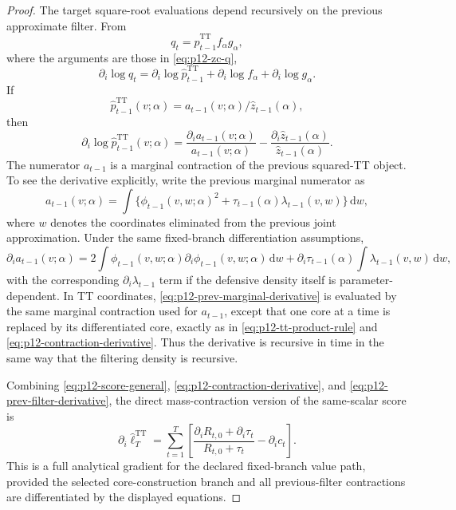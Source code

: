 \documentclass[11pt]{article}
\newcommand{\dd}{\mathrm{d}}
\newcommand{\TT}{\mathrm{TT}}
\theoremstyle{definition}
\theoremstyle{remark}
\begin{document}
\begin{proof}
The target square-root evaluations depend recursively on the previous
approximate filter.  From
\[
  q_t
  =
  \widehat p_{t-1}^{\TT}
  f_\alpha
  g_\alpha,
\]
where the arguments are those in \eqref{eq:p12-zc-q},
\[
  \partial_i\log q_t
  =
  \partial_i\log\widehat p_{t-1}^{\TT}
  +
  \partial_i\log f_\alpha
  +
  \partial_i\log g_\alpha.
  \label{eq:p12-recursive-logq-derivative}
\]
If
\[
  \widehat p_{t-1}^{\TT}(v;\alpha)
  =
  a_{t-1}(v;\alpha)/\widehat z_{t-1}(\alpha),
\]
then
\[
  \partial_i\log\widehat p_{t-1}^{\TT}(v;\alpha)
  =
  \frac{\partial_i a_{t-1}(v;\alpha)}{a_{t-1}(v;\alpha)}
  -
  \frac{\partial_i\widehat z_{t-1}(\alpha)}
       {\widehat z_{t-1}(\alpha)}.
  \label{eq:p12-prev-filter-derivative}
\]
The numerator \(a_{t-1}\) is a marginal contraction of the previous squared-TT
object.  To see the derivative explicitly, write the previous marginal
numerator as
\[
  a_{t-1}(v;\alpha)
  =
  \int
  \{\phi_{t-1}(v,w;\alpha)^2
  +\tau_{t-1}(\alpha)\lambda_{t-1}(v,w)\}
  \,\dd w,
  \label{eq:p12-prev-marginal-numerator}
\]
where \(w\) denotes the coordinates eliminated from the previous joint
approximation.  Under the same fixed-branch differentiation assumptions,
\[
  \partial_i a_{t-1}(v;\alpha)
  =
  2\int
  \phi_{t-1}(v,w;\alpha)
  \partial_i\phi_{t-1}(v,w;\alpha)
  \,\dd w
  +
  \partial_i\tau_{t-1}(\alpha)
  \int\lambda_{t-1}(v,w)\,\dd w,
  \label{eq:p12-prev-marginal-derivative}
\]
with the corresponding \(\partial_i\lambda_{t-1}\) term if the defensive
density itself is parameter-dependent.  In TT coordinates,
\eqref{eq:p12-prev-marginal-derivative} is evaluated by the same marginal
contraction used for \(a_{t-1}\), except that one core at a time is replaced
by its differentiated core, exactly as in
\eqref{eq:p12-tt-product-rule} and
\eqref{eq:p12-contraction-derivative}.  Thus the derivative is recursive in
time in the same way that the filtering density is recursive.

Combining \eqref{eq:p12-score-general},
\eqref{eq:p12-contraction-derivative}, and
\eqref{eq:p12-prev-filter-derivative}, the direct mass-contraction version of
the same-scalar score is
\[
  \boxed{
  \partial_i\widehat\ell_T^{\TT}
  =
  \sum_{t=1}^T
  \left[
  \frac{\partial_iR_{t,0}+\partial_i\tau_t}
       {R_{t,0}+\tau_t}
  -
  \partial_i c_t
  \right].
  }
  \label{eq:p12-final-score}
\]
This is a full analytical gradient for the declared fixed-branch value path,
provided the selected core-construction branch and all previous-filter
contractions are differentiated by the displayed equations.
\end{proof}
\end{document}
